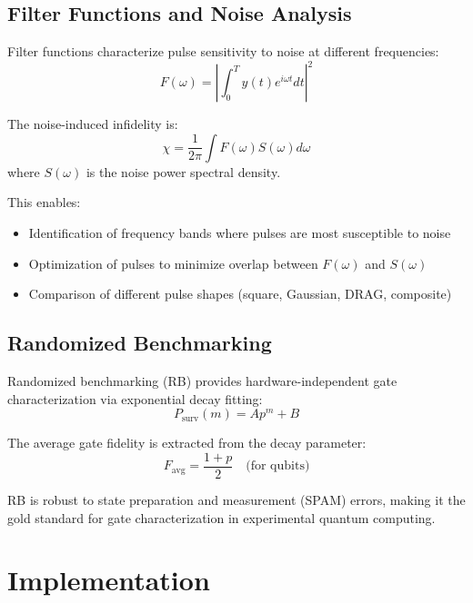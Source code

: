 \documentclass[11pt,a4paper]{article}
\theoremstyle{definition}
\theoremstyle{remark}
\begin{document}
\subsection{Filter Functions and Noise Analysis}

Filter functions characterize pulse sensitivity to noise at different frequencies:
\begin{equation}
F(\omega) = \left|\int_0^T y(t)e^{i\omega t}dt\right|^2
\end{equation}

The noise-induced infidelity is:
\begin{equation}
\chi = \frac{1}{2\pi}\int F(\omega)S(\omega)d\omega
\end{equation}
where $S(\omega)$ is the noise power spectral density.

This enables:
\begin{itemize}
    \item Identification of frequency bands where pulses are most susceptible to noise
    \item Optimization of pulses to minimize overlap between $F(\omega)$ and $S(\omega)$
    \item Comparison of different pulse shapes (square, Gaussian, DRAG, composite)
\end{itemize}

\subsection{Randomized Benchmarking}

Randomized benchmarking (RB) provides hardware-independent gate characterization via exponential decay fitting:
\begin{equation}
P_{\text{surv}}(m) = A p^m + B
\end{equation}

The average gate fidelity is extracted from the decay parameter:
\begin{equation}
F_{\text{avg}} = \frac{1+p}{2} \quad \text{(for qubits)}
\end{equation}

RB is robust to state preparation and measurement (SPAM) errors, making it the gold standard for gate characterization in experimental quantum computing.

\section{Implementation}
\label{sec:implementation}
\end{document}
